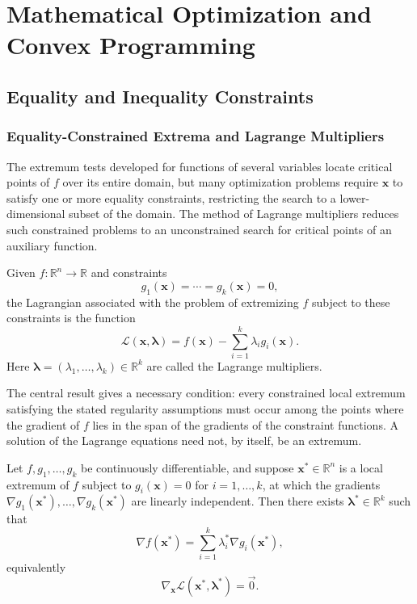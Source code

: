 \chapter{Mathematical Optimization and Convex Programming}

\section{Equality and Inequality Constraints}

\subsection{Equality-Constrained Extrema and Lagrange Multipliers}

The extremum tests developed for functions of several variables locate critical points of $f$ over its entire domain, but many optimization problems require $\mathbf{x}$ to satisfy one or more equality constraints, restricting the search to a lower-dimensional subset of the domain. The method of Lagrange multipliers reduces such constrained problems to an unconstrained search for critical points of an auxiliary function.

\begin{definition}[Lagrangian]
Given $f : \mathbb{R}^n \to \mathbb{R}$ and constraints
\[
g_1(\mathbf{x}) = \cdots = g_k(\mathbf{x}) = 0,
\] the Lagrangian associated with the problem of extremizing $f$ subject to these constraints is the function
\[
\mathcal{L}(\mathbf{x}, \boldsymbol{\lambda}) = f(\mathbf{x}) - \sum_{i=1}^{k} \lambda_i g_i(\mathbf{x}).
\]
Here $\boldsymbol{\lambda} = (\lambda_1, \dots, \lambda_k) \in \mathbb{R}^k$ are called the Lagrange multipliers.
\end{definition}

The central result gives a necessary condition: every constrained local
extremum satisfying the stated regularity assumptions must occur among
the points where the gradient of $f$ lies in the span of the gradients of
the constraint functions. A solution of the Lagrange equations need not,
by itself, be an extremum.

\begin{theorem}
Let $f, g_1, \dots, g_k$ be continuously differentiable, and suppose $\mathbf{x}^* \in \mathbb{R}^n$ is a local extremum of $f$ subject to $g_i(\mathbf{x}) = 0$ for $i = 1, \dots, k$, at which the gradients $\nabla g_1(\mathbf{x}^*), \dots, \nabla g_k(\mathbf{x}^*)$ are linearly independent. Then there exists $\boldsymbol{\lambda}^* \in \mathbb{R}^k$ such that
\[
\nabla f(\mathbf{x}^*) = \sum_{i=1}^{k} \lambda_i^* \nabla g_i(\mathbf{x}^*),
\]
equivalently
\[
\nabla_{\mathbf{x}} \mathcal{L}(\mathbf{x}^*, \boldsymbol{\lambda}^*) = \vec{0}.
\]

\end{theorem}

